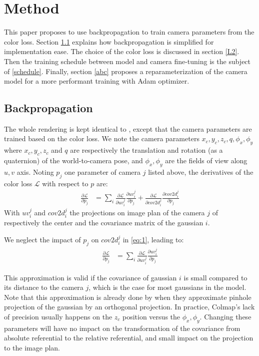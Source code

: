 \documentclass{article}
\begin{document}
\section{Method} \label{method}

This paper proposes to use backpropagation to train camera parameters from the color loss.
Section \ref{backprop} explains how backpropagation is simplified for implementation ease.
The choice of the color loss is discussed in section \ref{L2}.
Then the training schedule between model and camera fine-tuning is the subject of \ref{schedule}.
Finally, section \ref{abc} proposes a reparameterization of the camera model for a more performant training with Adam optimizer.

\subsection{Backpropagation} \label{backprop}
The whole rendering is kept identical to \cite{kerbl20233d}, except that the camera parameters are trained based on the color loss.
We note the camera parameters $x_c,y_c,z_c,q,\phi_x,\phi_y$ where $x_c,y_c,z_c$ and $q$ are respectively the translation and rotation (as a quaternion) of the
world-to-camera pose, and $\phi_x,\phi_y$ are the fields of view along $u,v$ axis.
Noting $p_j$ one parameter of camera $j$ listed above, the derivatives of the color loss $\mathcal{L}$ with respect to $p$ are:
\begin{align}
	\label{eq:1}
	\frac{\partial \mathcal{L}}{\partial p_j} &= \sum_{i} \frac{\partial \mathcal{L}}{\partial uv_i^j} \frac{\partial uv_i^j}{\partial p_j} + \frac{\partial \mathcal{L}}{\partial cov2d_i^j} \frac{\partial cov2d_i^j}{\partial p_j}
\end{align}
With $uv_i^j$ and $cov2d_i^j$ the projections on image plan of the camera $j$ of respectively the center and the covariance matrix of the gaussian $i$.

We neglect the impact of $p_j$ on $cov2d_i^j$ in \eqref{eq:1}, leading to:
\begin{align}
	\label{eq:2}
	\frac{\partial \mathcal{L}}{\partial p_j} &= \sum_{i} \frac{\partial \mathcal{L}}{\partial uv_i^j} \frac{\partial uv_i^j}{\partial p_j}
\end{align}

This approximation is valid if the covariance of gaussian $i$ is small compared to its distance to the camera $j$,
which is the case for most gaussians in the model. Note that this approximation is already done by \cite{kerbl20233d}
when they approximate pinhole projection of the gaussian by an orthogonal projection.
In practice, Colmap's lack of precision usually happens on the $z_c$ position versus the $\phi_x,\phi_y$.
Changing these parameters will have no impact on the transformation of the covariance from absolute referential
to the relative referential, and small impact on the projection to the image plan.
\end{document}
